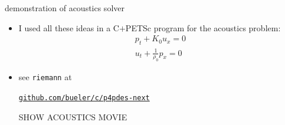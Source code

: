\documentclass[10pt,dvipsnames,usepdftitle=false,
hyperref={pdftitle = {Finite volume methods},
    pdfauthor = {Ed Bueler}}]{beamer}
\begin{document}
\begin{frame}{demonstration of acoustics solver}

\begin{itemize}
\item I used all these ideas in a C$+$PETSc program for the acoustics problem:
    $$\begin{matrix} p_t + K_0 u_x = 0 \\ u_t + \frac{1}{\rho_0} p_x = 0 \end{matrix}$$
\item see \texttt{riemann} at
\begin{center}
\href{https://github.com/bueler/p4pdes-next}{\texttt{github.com/bueler/c/p4pdes-next}}
\end{center}

\vspace{3mm}
\begin{center}
\alert{SHOW ACOUSTICS MOVIE}
\end{center}
\end{itemize}

\end{frame}
\end{document}
